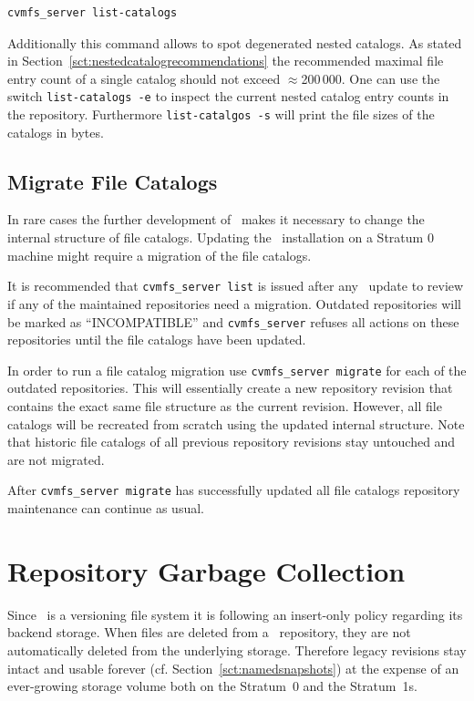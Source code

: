 \begin{verbatim}
cvmfs_server list-catalogs
\end{verbatim}

Additionally this command allows to spot degenerated nested catalogs.
As stated in Section~\ref{sct:nestedcatalogrecommendations} the recommended maximal file entry count of a single catalog should not exceed $\approx$200\,000.
One can use the switch \texttt{list-catalogs -e} to inspect the current nested catalog entry counts in the repository.
Furthermore \texttt{list-catalgos -s} will print the file sizes of the catalogs in bytes.

\subsection{Migrate File Catalogs}
In rare cases the further development of \cvmfs\ makes it necessary to change the internal structure of file catalogs.
Updating the \cvmfs\ installation on a Stratum 0 machine might require a migration of the file catalogs.

It is recommended that \texttt{cvmfs\_server list} is issued after any \cvmfs\ update to review if any of the maintained repositories need a migration.
Outdated repositories will be marked as ``INCOMPATIBLE'' and \texttt{cvmfs\_server} refuses all actions on these repositories until the file catalogs have been updated.

In order to run a file catalog migration use \texttt{cvmfs\_server migrate} for each of the outdated repositories.
This will essentially create a new repository revision that contains the exact same  file structure as the current revision.
However, all file catalogs will be recreated from scratch using the updated internal structure.
Note that historic file catalogs of all previous repository revisions stay untouched and are not migrated.

After \texttt{cvmfs\_server migrate} has successfully updated all file catalogs repository maintenance can continue as usual.



\section{Repository Garbage Collection}
\label{sct:garbagecollection}
Since \cvmfs\ is a versioning file system it is following an insert-only policy regarding its backend storage.
When files are deleted from a \cvmfs\ repository, they are not automatically deleted from the underlying storage.
Therefore legacy revisions stay intact and usable forever (cf. Section~\ref{sct:namedsnapshots}) at the expense of an ever-growing storage volume both on the Stratum~0 and the Stratum~1s.

